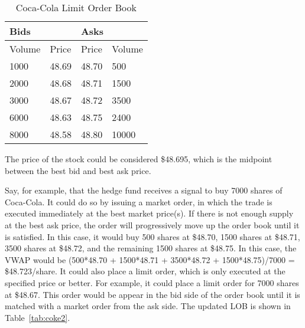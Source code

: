 \begin{table}[htbp]
\caption{Coca-Cola Limit Order Book} \label{tab:coke1}
\begin{center}
\begin{tabular}{ll|ll}
\hline \hline
\multicolumn{2}{l|}{\textbf{Bids}} & \multicolumn{2}{l}{\textbf{Asks}} \\
\hline
Volume           & Price          & Price           & Volume          \\
\hline
1000             & 48.69          & 48.70           & 500             \\
2000             & 48.68          & 48.71           & 1500            \\
3000             & 48.67          & 48.72           & 3500            \\
6000             & 48.63          & 48.75           & 2400            \\
8000             & 48.58          & 48.80           & 10000          
\end{tabular}
\end{center}
\end{table}

The price of the stock could be considered \$48.695, which is the midpoint between the best bid and best ask price. 

Say, for example, that the hedge fund receives a signal to buy 7000 shares of Coca-Cola. It could do so by issuing a market order, in which the trade is executed immediately at the best market price(s). If there is not enough supply at the best ask price, the order will progressively move up the order book until it is satisfied. In this case, it would buy 500 shares at \$48.70, 1500 shares at \$48.71, 3500 shares at \$48.72, and the remaining 1500 shares at \$48.75. In this case, the VWAP would be (500*48.70 + 1500*48.71 + 3500*48.72 + 1500*48.75)/7000 = \$48.723/share. It could also place a limit order, which is only executed at the specified price or better. For example, it could place a limit order for 7000 shares at \$48.67. This order would be appear in the bid side of the order book until it is matched with a market order from the ask side. The updated LOB is shown in Table~\ref{tab:coke2}.

